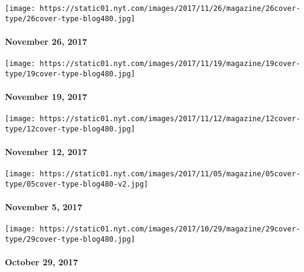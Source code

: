 \href{https://www.nytimes.com/issue/magazine/2017/11/27/112617-issue}{}

\texttt{[image: https://static01.nyt.com/images/2017/11/26/magazine/26cover-type/26cover-type-blog480.jpg]}

\hypertarget{november-26-2017}{%
\paragraph{November 26, 2017}\label{november-26-2017}}

\href{https://www.nytimes.com/issue/magazine/2017/11/17/111917-issue}{}

\texttt{[image: https://static01.nyt.com/images/2017/11/19/magazine/19cover-type/19cover-type-blog480.jpg]}

\hypertarget{november-19-2017}{%
\paragraph{November 19, 2017}\label{november-19-2017}}

\href{https://www.nytimes.com/interactive/2017/11/07/magazine/tech-design-future-autonomous-cars-american-interstate-highway-roads-suburbs.html}{}

\texttt{[image: https://static01.nyt.com/images/2017/11/12/magazine/12cover-type/12cover-type-blog480.jpg]}

\hypertarget{november-12-2017}{%
\paragraph{November 12, 2017}\label{november-12-2017}}

\href{https://www.nytimes.com/issue/magazine/2017/11/03/110517-issue}{}

\texttt{[image: https://static01.nyt.com/images/2017/11/05/magazine/05cover-type/05cover-type-blog480-v2.jpg]}

\hypertarget{november-5-2017}{%
\paragraph{November 5, 2017}\label{november-5-2017}}

\href{https://www.nytimes.com/issue/magazine/2017/10/27/102917-issue}{}

\texttt{[image: https://static01.nyt.com/images/2017/10/29/magazine/29cover-type/29cover-type-blog480.jpg]}

\hypertarget{october-29-2017}{%
\paragraph{October 29, 2017}\label{october-29-2017}}

